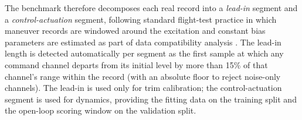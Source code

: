 \documentclass[11pt]{article}
\begin{document}
The benchmark therefore decomposes each real record into a \emph{lead-in}
segment and a \emph{control-actuation} segment, following standard flight-test
practice in which maneuver records are windowed around the excitation and
constant bias parameters are estimated as part of data compatibility analysis
\citep{KleinMorelli2006, jategaonkar2006flight, Tischler1995SystemIM}. The
lead-in length is detected automatically per segment as the first sample at
which any command channel departs from its initial level by more than 15\% of
that channel's range within the record (with an absolute floor to reject
noise-only channels). The lead-in is used only for trim calibration; the
control-actuation segment is used for dynamics, providing the fitting data on
the training split and the open-loop scoring window on the validation split.
\end{document}
